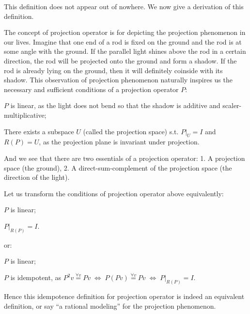 \documentclass{article}
\begin{document}
\begin{Rmk}{}
    This definition does not appear out of nowhere. We now give a derivation of this definition. 

    The concept of projection operator is for depicting the projection phenomenon in our lives. Imagine that one end of a rod is fixed on the ground and the rod is at some angle with the ground. If the parallel light shines above the rod in a certain direction, the rod will be projected onto the ground and form a shadow. If the rod is already lying on the ground, then it will definitely coinside with its shadow. This observation of projection phenomenon naturally inspires us the necessary and sufficient conditions of a projection operator $P$:
    \begin{compactenum}
        \item \textcolor{Th}{$P$ is linear,} as the light does not bend so that the shadow is additive and scaler-multiplicative;
        \item \textcolor{Th}{There exists a subspace $U$ (called the projection space) s.t. $P|_U = I$ and $R(P) = U$,} as the projection plane is invariant under projection.
    \end{compactenum}
    And we see that there are two essentials of a projection operator: 1. A projection space (the ground), 2. A direct-sum-complement of the projection space (the direction of the light).

    Let us transform the conditions of projection operator above equivalently:
    \begin{compactenum}
        \item \textcolor{Th}{$P$ is linear;}
        \item \textcolor{Th}{$P|_{R(P)} = I$.}
    \end{compactenum}
    or:
    \begin{compactenum}
        \item \textcolor{Th}{$P$ is linear;}
        \item \textcolor{Th}{$P$ is idempotent,} as $P^2v \overset{\forall v}{=} Pv \;\Leftrightarrow\; P(Pv) \overset{\forall v}{=} Pv \;\Leftrightarrow\; P|_{R(P)} = I$.
    \end{compactenum}
    Hence this idempotence definition for projection operator is indeed an equivalent definition, or say ``a rational modeling'' for the projection phenomenon.


\end{Rmk}
\end{document}
